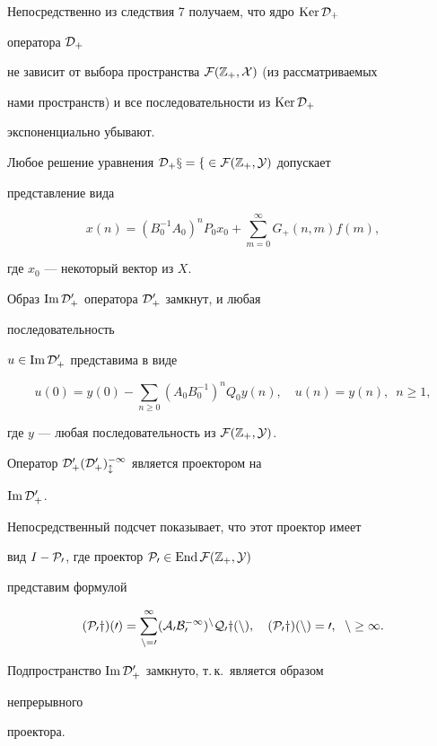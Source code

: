  


Непосредственно из следствия 7 получаем, что ядро $\operatorname{Ker}\cal D_+$ 


оператора $\cal D_+$ 


не зависит от выбора пространства $\cal F(\Bbb Z_+,X)$ (из рассматриваемых 


нами пространств) и все последовательности из $\operatorname{Ker}\cal D_+$ 


экспоненциально убывают. 


 


\begin{cor} 


Любое решение уравнения $\cal D_+x=f\in\cal F(\Bbb Z_+,Y)$ допускает 


представление вида 


$$ 


x(n)=(B^{-1}_0A_0)^n P_0x_0+\sum^\infty_{m=0}G_+(n,m)f(m), 


$$ 


где $x_0$ --- некоторый вектор из $X$. 


\end{cor} 


 


\begin{cor} 


Образ $\operatorname{Im}\cal D^0_+$ оператора $\cal D^0_+$ замкнут, и любая 


последовательность 


$u\in\operatorname{Im}\cal D^0_+$ представима в виде 


$$ 


u(0)=y(0)-\sum_{n\ge0}(A_0B^{-1}_0)^n Q_0y(n),\quad 


u(n)=y(n),\ \; n\ge1, 


$$ 


где $y$ --- любая последовательность из $\cal F(\Bbb Z_+,Y)$. 


\end{cor} 


 


\begin{pf} 


Оператор $\cal D^0_+(\cal D^0_+)^{-1}_l$ является проектором на 


$\operatorname{Im}\cal D^0_+$. 


Непосредственный подсчет показывает, что этот проектор имеет 


вид $I-\cal P_0$, где проектор $\cal P_0\in\operatorname{End}\cal F(\Bbb Z_+,Y)$ 


представим формулой 


$$ 


(\cal P_0y)(0)=\sum^\infty_{n=0}(A_0B^{-1}_0)^n Q_0y(n),\quad 


(\cal P_0y)(n)=0,\ \; n\ge1. 


$$ 


Подпространство $\operatorname{Im}\cal D^0_+$ замкнуто, т.\,к.\ является образом 


непрерывного 


проектора. 


\end{pf} 


